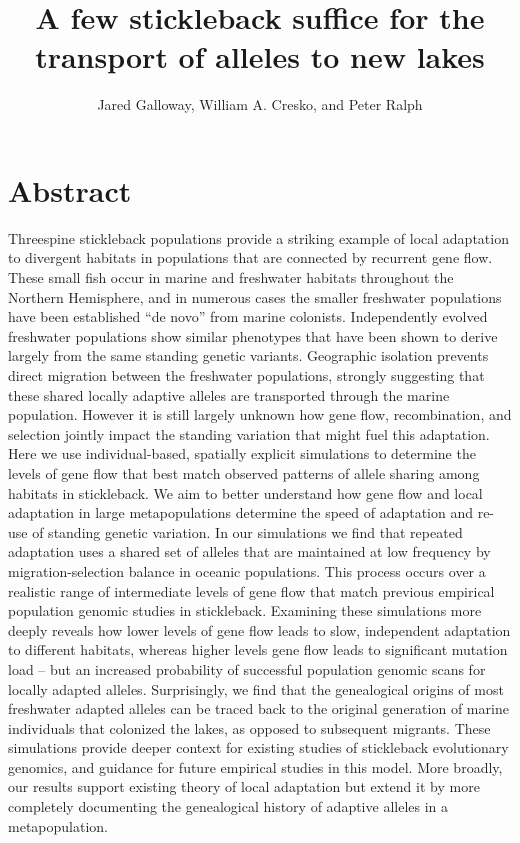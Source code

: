 \documentclass{article}
\begin{document}
\title{A few stickleback suffice for the transport of alleles to new lakes}
\author{Jared Galloway, William A. Cresko, and Peter Ralph}
\maketitle


\section*{Abstract}

Threespine stickleback populations provide a striking example of local adaptation to divergent habitats 
in populations that are connected by recurrent gene flow. 
These small fish occur in marine and freshwater habitats throughout the Northern Hemisphere, and in numerous cases the smaller freshwater populations have been established ``de novo'' from marine colonists. 
Independently evolved freshwater populations show similar phenotypes that have been shown to derive largely from the same standing genetic variants.
Geographic isolation prevents direct migration between the freshwater populations, strongly suggesting that these shared locally adaptive alleles are transported through the marine population.
However it is still largely unknown how gene flow, recombination, and selection jointly impact the standing variation that might fuel this adaptation.
Here we use individual-based, spatially explicit simulations to determine the levels of gene flow that best match observed patterns of allele sharing among habitats in stickleback.
We aim to better understand how gene flow and local adaptation in large metapopulations determine the speed of adaptation and re-use of standing genetic variation. 
In our simulations we find that repeated adaptation uses a shared set of alleles that are maintained at low frequency by migration-selection balance in oceanic populations. 
This process occurs over a realistic range of intermediate levels of gene flow that match previous empirical population genomic studies in stickleback. 
Examining these simulations more deeply reveals how lower levels of gene flow leads to slow, independent adaptation to different habitats, whereas higher levels gene flow leads to significant mutation load -- but an increased probability of successful population genomic scans for locally adapted alleles. 
Surprisingly, we find that the genealogical origins of most freshwater adapted alleles can be traced back to the original generation of marine individuals that colonized the lakes, as opposed to subsequent migrants. 
These simulations provide deeper context for existing studies of stickleback evolutionary genomics, and guidance for future empirical studies in this model.
More broadly, our results support existing theory of local adaptation but extend it by more completely documenting the genealogical history of adaptive alleles in a metapopulation.  
\end{document}
